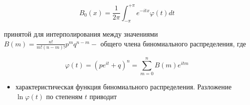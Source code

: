 \documentclass[10pt]{article}
\begin{document}
\[

B_{0}(x)=\frac{1}{2 \pi} \int_{-\pi}^{+\pi} e^{-i t x} \varphi(t) d t

\]



принятой для интерполирования между значениями $B(m)=\frac{n !}{m !(n-m) !} p^{m} q^{n-m}-$ общего члена биномиального распределения, где



\[

\varphi(t)=\left(p e^{i t}+q\right)^{n}=\sum_{m=0}^{n} B(m) e^{i t m}

\]



\begin{itemize}

  \item характеристическая функция биномиального распределения. Разложение $\ln \varphi(t)$ по степеням $t$ приводит

\end{itemize}
\end{document}
